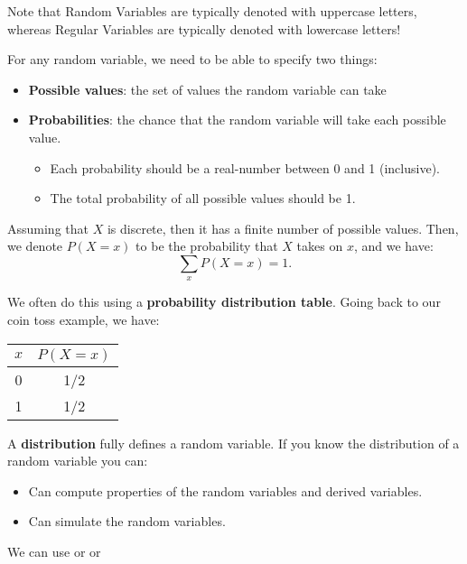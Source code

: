 \documentclass[openany]{book}
\begin{document}
\begin{rmk}
	Note that Random Variables are typically denoted with uppercase letters, whereas Regular Variables are typically denoted with lowercase letters!
\end{rmk}

For any random variable, we need to be able to specify two things:
\begin{itemize}
	\item \textbf{Possible values}: the set of values the random variable can take 
	\item \textbf{Probabilities}: the chance that the random variable will take each possible value.
	\begin{itemize}
		\item Each probability should be a real-number between 0 and 1 (inclusive).
		\item The total probability of all possible values should be 1.
	\end{itemize}
\end{itemize}

Assuming that $X$ is discrete, then it has a finite number of possible values. Then, we denote $P(X = x)$ to be the probability that $X$ takes on $x$, and we have:
\begin{equation*}
	\sum_x P(X = x) = 1.
\end{equation*}

We often do this using a \textbf{probability distribution table}. Going back to our coin toss example, we have:
\begin{center}
	\begin{tabular}{|c|c|}
		\hline
		$x$ & $P(X=x)$ \\
		\hline
		0 & 1/2 \\
		\hline
		1 & 1/2 \\
		\hline
	\end{tabular}
\end{center}

\begin{defn}[Distribution]
	A \textbf{distribution} fully defines a random variable.  If you know the distribution of a random variable you can:
	\begin{itemize}
		\item Can compute properties of the random variables and derived variables.
		\item Can simulate the random variables.
	\end{itemize}

	We can use  or  or 
\end{defn}
\end{document}
